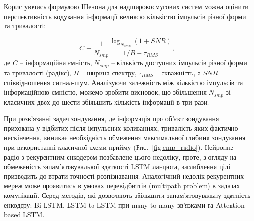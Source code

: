 Користуючись формулою Шенона для надширокосмугових систем 
\cite{imp:ChannelLimitations} можна оцінити перспективність кодування 
інформації великою кількістю імпульсів різної форми та тривалості:

\begin{equation}
C = \frac{1}{N_{smp}} 
\frac{\log_{N_{smp}} \left( 1 + SNR \right)}{1/B + \tau_{RMS}},
\end{equation}
%
де $ C $ -- інформаційна ємність, $ N_{smp} $ -- кількість доступних 
імпульсів різної форми та тривалості (радікс), $ B $ -- ширина спектру, 
$ \tau_{RMS} $ -- скважність, а $ SNR $ -- співвідношення сигнал-шум.
Аналізуючи залежність між кількістю імпульсів та інформаційною ємністю, 
можемо зробити висновок, що збільшення $ N_{smp} $ зі класичних двох до 
шести збільшить кількість інформації в три рази.



При розв'язанні задач зондування, де інформація про об'єкт зондування 
прихована у відбитих після-імпульсних коливаннях, тривалість яких фактично 
нескінченна, виникає необхідність обмеження максимальної глибини зондування 
при використанні класичної схеми прийму (Рис.~\ref{fig:emp_radio}).
Нейронне радіо з рекурентним енкодером позбавлене цього недоліку, проте, з 
огляду на обмеженість запам'ятовувальної здатності LSTM ланцюга,
заглиблення цілі призводить до втрати точності розпізнавання. Аналогічний 
недолік рекурентних мереж може проявитись в умовах перевідбиттів (multipath 
problem) в задачах комунікації. Серед методів, які дозволяють збільшити 
запам'ятовувальну здатність енкодеру: Bi-LSTM, LSTM-to-LSTM при 
many-to-many зв'язками та Attention based LSTM.

